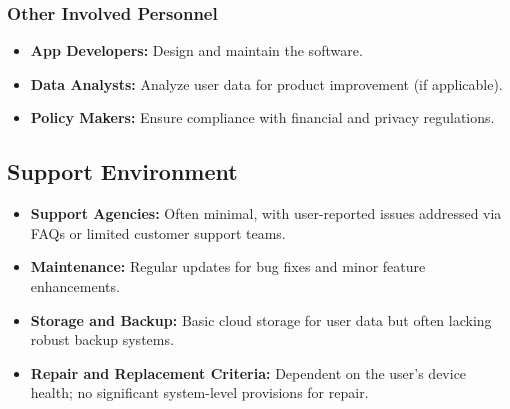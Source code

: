 \subsubsection{Other Involved Personnel}
\begin{itemize}
    \item \textbf{App Developers:} Design and maintain the software.
    \item \textbf{Data Analysts:} Analyze user data for product improvement (if applicable).
    \item \textbf{Policy Makers:} Ensure compliance with financial and privacy regulations.
\end{itemize}

\subsection{Support Environment}
\begin{itemize}
    \item \textbf{Support Agencies:} Often minimal, with user-reported issues addressed via FAQs or limited customer support teams.
    \item \textbf{Maintenance:} Regular updates for bug fixes and minor feature enhancements.
    \item \textbf{Storage and Backup:} Basic cloud storage for user data but often lacking robust backup systems.
    \item \textbf{Repair and Replacement Criteria:} Dependent on the user’s device health; no significant system-level provisions for repair.
\end{itemize}






